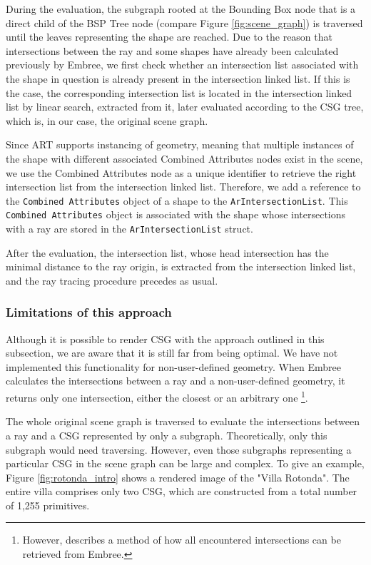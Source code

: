 During the evaluation, the subgraph rooted at the Bounding Box node that is a direct child of the BSP Tree node (compare Figure \ref{fig:scene_graph}) is traversed until the leaves representing the shape are reached. Due to the reason that intersections between the ray and some shapes have already been calculated previously by Embree, we first check whether an intersection list associated with the shape in question is already present in the intersection linked list. If this is the case, the corresponding intersection list is located in the intersection linked list by linear search, extracted from it, later evaluated according to the CSG tree, which is, in our case, the original scene graph.

Since ART supports instancing of geometry, meaning that multiple instances of the shape with different associated Combined Attributes nodes exist in the scene, we use the Combined Attributes node as a unique identifier to retrieve the right intersection list from the intersection linked list.
Therefore, we add a reference to the \texttt{Combined Attributes} object of a shape to the \texttt{ArIntersectionList}. This \texttt{Combined Attributes} object is associated with the shape whose intersections with a ray are stored in the \texttt{ArIntersectionList} struct.


After the evaluation, the intersection list, whose head intersection has the minimal distance to the ray origin, is extracted from the intersection linked list, and the ray tracing procedure precedes as usual.

\subsubsection{Limitations of this approach}

Although it is possible to render CSG with the approach outlined in this subsection, we are aware that it is still far from being optimal. We have not implemented this functionality for non-user-defined geometry. When Embree calculates the intersections between a ray and a non-user-defined geometry, it returns only one intersection, either the closest or an arbitrary one \footnote{However, \cite{karaffova2016} describes a method of how all encountered intersections can be retrieved from Embree.}.

The whole original scene graph is traversed to evaluate the intersections between a ray and a CSG represented by only a subgraph. Theoretically, only this subgraph would need traversing. However, even those subgraphs representing a particular CSG in the scene graph can be large and complex. To give an example, Figure \ref{fig:rotonda_intro} shows a rendered image of the "Villa Rotonda". The entire villa comprises only two CSG, which are constructed from a total number of 1,255 primitives.

